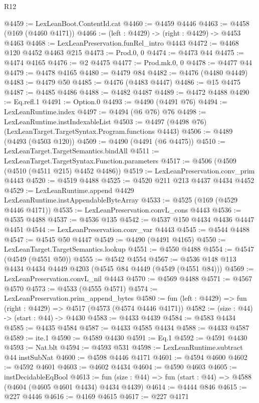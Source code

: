 \begin{lexlean}{R12}
\begin{coremodule}
@4459 := LexLeanBoot.ContentId.cat
@4460 := @4459 @4446
@4463 := @4458 (@169 (@4460 @4171))
@4466 := (left : @4429) -> (right : @4429) -> @4453 @4463
@4468 := LexLeanPreservation.funRel_intro @4443
@4472 := @4468 @120 @4452 @4463 @215
@4473 := Prod.{0, 0}
@4474 := @4473 @44
@4475 := @4474 @4165
@4476 := @2 @4475
@4477 := Prod.mk.{0, 0}
@4478 := @4477 @44
@4479 := @4478 @4165
@4480 := @4479 @84
@4482 := @4476 (@4480 @4449)
@4483 := @4479 @50
@4485 := @4476 (@4483 @4447)
@4486 := @15 @4475
@4487 := @4485 @4486
@4488 := @4482 @4487
@4489 := @4472 @4488
@4490 := Eq.refl.{1}
@4491 := Option.{0}
@4493 := @4490 (@4491 @76)
@4494 := LexLeanRuntime.index
@4497 := @4494 (@6 @76) @76
@4498 := LexLeanRuntime.instIndexableList
@4503 := @4497 (@4498 @76) (LexLeanTarget.TargetSyntax.Program.functions @4443)
@4506 := @4489 (@4493 (@4503 @120))
@4509 := @4490 (@4491 (@6 @4475))
@4510 := LexLeanTarget.TargetSemantics.bindAll
@4511 := LexLeanTarget.TargetSyntax.Function.parameters
@4517 := @4506 (@4509 (@4510 (@4511 @215) @4452 @4486))
@4519 := LexLeanPreservation.conv_prim @4443
@4520 := @4519 @4488
@4525 := @4520 @211 @213 @4437 @4434 @4452
@4529 := LexLeanRuntime.append @4429 LexLeanRuntime.instAppendableByteArray
@4533 := @4525 (@169 (@4529 @4446 @4171))
@4535 := LexLeanPreservation.convL_cons @4443
@4536 := @4535 @4488
@4537 := @4536 @135
@4542 := @4537 @150 @4434 @4436 @4447 @4451
@4544 := LexLeanPreservation.conv_var @4443
@4545 := @4544 @4488
@4547 := @4545 @50 @4447
@4549 := @4490 (@4491 @4165)
@4550 := LexLeanTarget.TargetSemantics.lookup
@4551 := @4550 @4488
@4554 := @4547 (@4549 (@4551 @50))
@4555 := @4542 @4554
@4567 := @4536 @148 @113 @4434 @4434 @4449 @4203 (@4545 @84 @4449 (@4549 (@4551 @84)))
@4569 := LexLeanPreservation.convL_nil @4443
@4570 := @4569 @4488
@4571 := @4567 @4570
@4573 := @4533 (@4555 @4571)
@4574 := LexLeanPreservation.prim_append_bytes
@4580 := fun (left : @4429) => fun (right : @4429) => @4517 (@4573 (@4574 @4446 @4171))
@4582 := (size : @44) -> (start : @44) -> @4430
@4583 := @4433 @4439
@4584 := @4583 @4434
@4585 := @4435 @4584
@4587 := @4433 @4585 @4434
@4588 := @4433 @4587
@4589 := ite.{1}
@4590 := @4589 @4430
@4591 := Eq.{1}
@4592 := @4591 @4430
@4593 := Nat.blt
@4594 := @4593 @531
@4598 := LexLeanRuntime.subtract @44 instSubNat
@4600 := @4598 @4446 @4171
@4601 := @4594 @4600
@4602 := @4592 @4601
@4603 := @4602 @4434
@4604 := @4590 @4603
@4605 := instDecidableEqBool
@4613 := fun (size : @44) => fun (start : @44) => @4588 (@4604 (@4605 @4601 @4434) @4434 @4439)
@4614 := @4444 @846
@4615 := @227 @4446
@4616 := @4169 @4615
@4617 := @227 @4171

\end{coremodule}
\end{lexlean}
